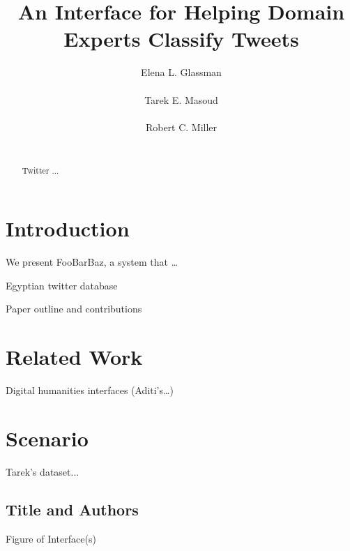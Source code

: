 \documentclass{sigchi}
\begin{document}
\title{An Interface for Helping Domain Experts Classify Tweets}

\author{
\alignauthor Elena L. Glassman\\
\\
\alignauthor Tarek E. Masoud\\
\\
\alignauthor Robert C. Miller\\
\\
}

\maketitle

\begin{abstract}
Twitter ...
\end{abstract}



\section{Introduction}



We present FooBarBaz, a system that …

Egyptian twitter database

Paper outline and contributions

\section{Related Work}

Digital humanities interfaces (Aditi's…)

\section{Scenario}

Tarek's dataset...

\subsection{Title and Authors}

Figure of Interface(s)
\end{document}
